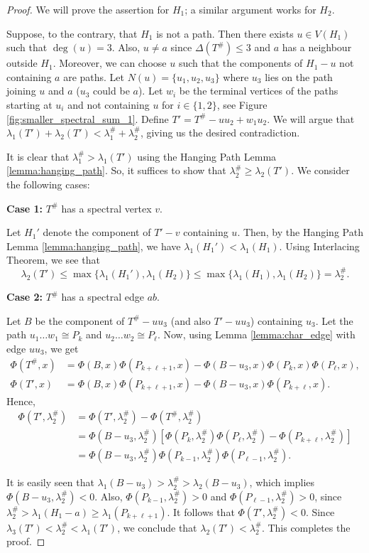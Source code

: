 \documentclass[11pt]{article}
\theoremstyle{plain}
\numberwithin{equation}{section}
\begin{document}
\begin{proof} We will prove the assertion for $H_1$; a similar argument works for $H_2$.

Suppose, to the contrary, that $H_1$ is not a path. Then there exists $u\in V(H_1)$ such that $\deg(u)=3$. Also, $u\neq a$ since $\Delta(T^{\#})\le 3$ and $a$ has a neighbour outside $H_1$. Moreover, we can choose $u$ such that the components of $H_1-u$ not containing $a$ are paths. Let $N(u)=\{u_1, u_2, u_3\}$ where $u_3$ lies on the path joining $u$ and $a$ ($u_3$ could be $a$). Let $w_i$ be the terminal vertices of the paths starting at $u_i$ and not containing $u$ for $i\in \{1,2\}$, see Figure \ref{fig:smaller_spectral_sum_1}. Define $T' = T^{\#} - uu_2 + w_1u_2$. We will argue that $\lambda_1(T') + \lambda_2(T') < \lambda_1^{\#} + \lambda_2^{\#}$, giving us the desired contradiction.

It is clear that $\lambda_1^{\#} > \lambda_1(T')$ using the Hanging Path Lemma \ref{lemma:hanging_path}. So, it suffices to show that $\lambda_2^{\#} \ge \lambda_2(T')$. We consider the following cases:

\textbf{Case 1:} $T^{\#}$ has a spectral vertex $v$.

Let $H_1'$ denote the component of $T'-v$ containing $u$. Then, by the Hanging Path Lemma \ref{lemma:hanging_path}, we have $\lambda_1(H_1')<\lambda_1(H_1)$. Using Interlacing Theorem, we see that
\[ \lambda_2(T')\le \max\{\lambda_1(H_1'), \lambda_1(H_2)\} \le \max\{\lambda_1(H_1), \lambda_1(H_2)\} = \lambda_2^{\#}.\]

\textbf{Case 2:} $T^{\#}$ has a spectral edge $ab$.

Let $B$ be the component of $T^{\#} - uu_3$ (and also $T'-uu_3$) containing $u_3$. Let the path $u_1 \ldots w_1 \cong P_k$ and $u_2\ldots w_2 \cong P_{\ell}$. Now, using Lemma \ref{lemma:char_edge} with edge $uu_3$, we get 
\begin{align*}
    \Phi(T^{\#}, x) & = \Phi(B,x)\Phi(P_{k + \ell + 1},x) - \Phi(B-u_3, x)\Phi(P_k,x)\Phi(P_{\ell},x),\\
    \Phi(T', x) & = \Phi(B,x)\Phi(P_{k + \ell + 1},x) - \Phi(B-u_3, x)\Phi(P_{k+\ell},x).
\end{align*}
Hence, 
\begin{align*}
    \Phi(T', \lambda_2^{\#}) & = \Phi(T', \lambda_2^{\#}) - \Phi(T^{\#}, \lambda_2^{\#}) \\
    & =\Phi(B-u_3, \lambda_2^{\#})\left[ \Phi(P_k, \lambda_2^{\#})\Phi(P_{\ell}, \lambda_2^{\#}) - \Phi(P_{k+\ell}, \lambda_2^{\#}) \right]\\
    & = \Phi(B-u_3, \lambda_2^{\#})\Phi(P_{k-1}, \lambda_2^{\#})\Phi(P_{\ell-1}, \lambda_2^{\#}).
\end{align*}

It is easily seen that $\lambda_1(B-u_3) > \lambda_2^{\#} > \lambda_2(B-u_3)$, which implies $\Phi(B-u_3, \lambda_2^{\#})<0$. Also, $\Phi(P_{k-1}, \lambda_2^{\#})>0$ and $\Phi(P_{\ell-1}, \lambda_2^{\#}) > 0$, since $\lambda_2^{\#}> \lambda_1(H_1 - a)\ge \lambda_1(P_{k+\ell+1})$. It follows that $\Phi(T', \lambda_2^{\#})< 0$. Since $\lambda_3(T') < \lambda_2^{\#} < \lambda_1(T')$, we conclude that $\lambda_2(T')<\lambda_2^{\#}$. This completes the proof.
\end{proof}
\end{document}

